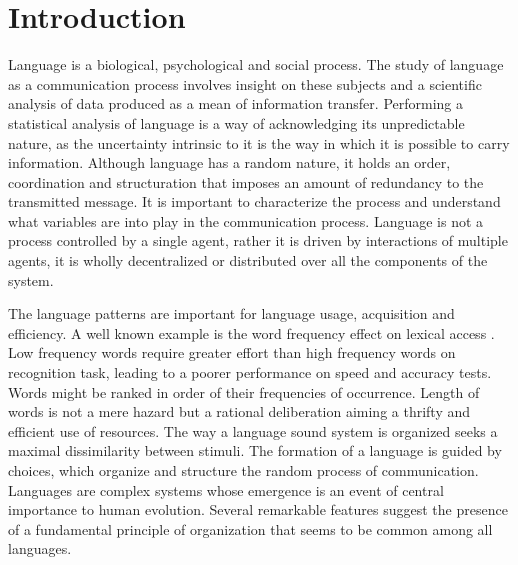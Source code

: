 \chapter{Introduction}
Language is a biological, psychological and social process. 
The study of language as a communication process involves insight on these subjects 
and a scientific analysis of data produced as a mean of information transfer. 
Performing a statistical analysis of language is a way of acknowledging 
its unpredictable nature, as the uncertainty intrinsic to it is the 
way in which it is possible to carry information.
Although language has a random nature, 
it holds an order, coordination and structuration that 
imposes an amount of redundancy to the transmitted message.
It is important to characterize the process and understand what variables 
are into play in the communication process.
Language is not a process controlled by a single agent, rather it is 
driven by interactions of multiple agents, it is wholly decentralized or distributed 
over all the components of the system.

The language patterns are important for language usage, acquisition and efficiency.
A well known example is the word frequency effect on lexical access \citep{whaley1978,grainger90,saly1989}.
Low frequency words require greater effort than high frequency words on recognition task,
leading to a poorer performance on speed and accuracy tests. %
Words might be ranked in order of their frequencies of occurrence.
Length of words is not a mere hazard 
but a rational deliberation aiming a thrifty and efficient use of resources. 
The way a language sound system is organized seeks a maximal dissimilarity between stimuli. 
The formation of a language is guided by choices, which organize and
structure the random process of communication. Languages are complex systems whose emergence is
an event of central importance to human evolution. Several remarkable features suggest the presence of
a fundamental principle of organization that seems to be common among all languages.


